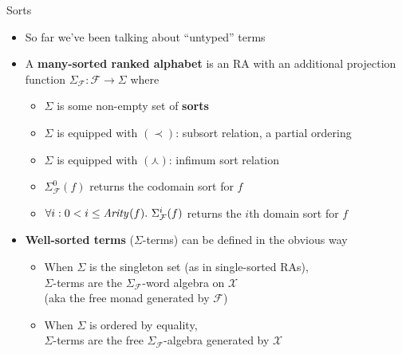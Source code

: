 \documentclass[pdf,fyma2]{prosper} %
\newcommand{\var}[1]{\ensuremath{\text{\textrm{\textit{#1}}}}}
\newcommand{\ARITY}[1][]{\ensuremath{\var{Arity}_{#1}}}
\newcommand{\defn}[1]{\textbf{#1}}
\begin{document}
\begin{slide}{Sorts}
	\begin{itemize}
    \item So far we've been talking about ``untyped'' terms
    \item A \defn{many-sorted ranked alphabet} is an RA with an additional projection function $\Sigma_\mathcal{F} : \mathcal{F} \to \Sigma$ where
    	\begin{itemize}
        \item $\Sigma$ is some non-empty set of \defn{sorts}
        \item $\Sigma$ is equipped with $(\prec)$: subsort relation, a partial ordering
        \item $\Sigma$ is equipped with $(\curlywedge)$: infimum sort relation
        \item $\Sigma_\mathcal{F}^0(f)$ returns the codomain sort for $f$
        \item $\forall i : 0 < i \leq \ARITY(f).~ \Sigma_\mathcal{F}^i(f)$ returns the $i$th domain sort for $f$
        \end{itemize}
    \item \defn{Well-sorted terms} ($\Sigma$-terms) can be defined in the obvious way
    	\begin{itemize}
        \item When $\Sigma$ is the singleton set (as in single-sorted RAs),
            \\ $\Sigma$-terms are the $\Sigma_\mathcal{F}$-word algebra on $\mathcal{X}$
            \\ (aka the free monad generated by $\mathcal{F}$)
        \item When $\Sigma$ is ordered by equality,
            \\ $\Sigma$-terms are the free $\Sigma_\mathcal{F}$-algebra generated by $\mathcal{X}$
        \end{itemize}
	\end{itemize}
\end{slide}
\end{document}
